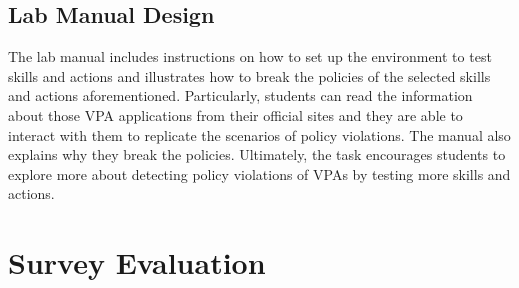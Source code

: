 \documentclass{article}
\begin{document}
\subsection{Lab Manual Design} 

The lab manual includes instructions on how to set up the environment to test skills and actions and illustrates how to break the policies of the selected skills and actions aforementioned. Particularly, students can read the information about those VPA applications from their official sites and they are able to interact with them to replicate the scenarios of policy violations. The manual also explains why they break the policies. Ultimately, the task encourages students to explore more about detecting policy violations of VPAs by testing more skills and actions.

\section{Survey Evaluation}\label{Survey Evaluation}
\end{document}
